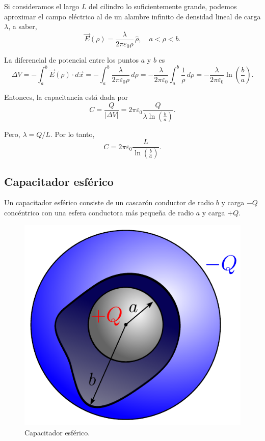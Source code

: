 Si consideramos el largo $L$ del cilindro lo suficientemente grande, podemos aproximar el campo eléctrico al de un alambre infinito de densidad lineal de carga $\lambda$, a saber,
$$\Vec{E}(\rho) = \frac{\lambda}{2\pi \varepsilon_0 \rho}  \,\hat{\rho}, \quad a < \rho < b.$$

La diferencial de potencial entre los puntos $a$ y $b$ es
$$  \Delta V = - \int_a^b \Vec{E}(\rho) \cdot d\Vec{x}  
= - \int_a^b\frac{\lambda}{2\pi \varepsilon_0 \rho}\, d\rho 
= - \frac{\lambda}{2\pi \varepsilon_0} \int_a^b \frac{1}{\rho} \,d\rho 
= - \frac{\lambda}{2\pi \varepsilon_0} \ln\left( \frac{b}{a} \right).  $$

Entonces, la capacitancia está dada por
$$C =  \frac{Q}{|\Delta V|} = 2\pi \varepsilon_0  \frac{Q}{\lambda\ln\left(  \frac{b}{a}\right)}.$$

Pero, $\lambda = Q/L$. Por lo tanto,
$$C = 2\pi \varepsilon_0  \frac{L}{\ln\left(  \frac{b}{a}\right)}.$$

\subsection*{Capacitador esférico}

Un capacitador esférico consiste de un cascarón conductor de radio $b$ y carga $-Q$ concéntrico con una esfera conductora más pequeña de radio $a$ y carga $+Q$.

\begin{figure}[H]
    \centering
    \includegraphics[scale = 0.7]{Figuras/Capacitador-Esferico.pdf}
    \caption{Capacitador esférico.}
    \label{fig:Cap-Esferico}
\end{figure}


